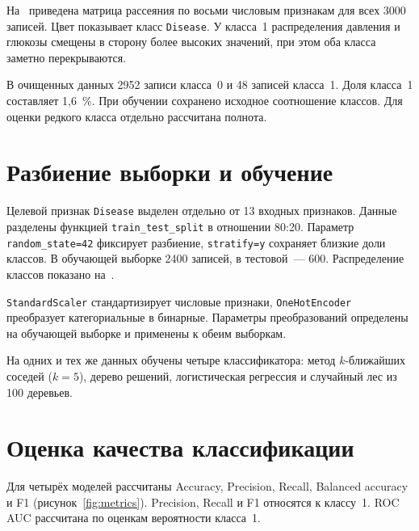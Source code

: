 \documentclass[a4paper,14pt]{extarticle}
\begin{document}


На~ приведена матрица рассеяния по восьми числовым признакам для всех 3000 записей. Цвет показывает класс \texttt{Disease}. У класса~1 распределения давления и глюкозы смещены в сторону более высоких значений, при этом оба класса заметно перекрываются.


В очищенных данных 2952 записи класса~0 и 48 записей класса~1. Доля класса~1 составляет 1,6~\%. При обучении сохранено исходное соотношение классов. Для оценки редкого класса отдельно рассчитана полнота.

\section{Разбиение выборки и обучение}

Целевой признак \texttt{Disease} выделен отдельно от 13 входных признаков. Данные разделены функцией \texttt{train\_test\_split} в отношении 80:20. Параметр \texttt{random\_state=42} фиксирует разбиение, \texttt{stratify=y} сохраняет близкие доли классов. В обучающей выборке 2400 записей, в тестовой~--- 600. Распределение классов показано на~.


\texttt{StandardScaler} стандартизирует числовые признаки, \texttt{OneHotEncoder} преобразует категориальные в бинарные. Параметры преобразований определены на обучающей выборке и применены к обеим выборкам.

На одних и тех же данных обучены четыре классификатора: метод $k$-ближайших соседей ($k=5$), дерево решений, логистическая регрессия и случайный лес из 100 деревьев.

\section{Оценка качества классификации}

Для четырёх моделей рассчитаны Accuracy, Precision, Recall, Balanced accuracy и F1 (рисунок~\ref{fig:metrics}). Precision, Recall и F1 относятся к классу~1. ROC AUC рассчитана по оценкам вероятности класса~1.
\end{document}
